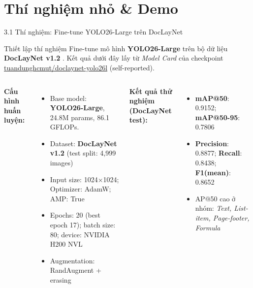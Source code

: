 \documentclass[aspectratio=1610,8pt]{beamer}
\begin{document}
\section{Thí nghiệm nhỏ \& Demo}
\begin{frame}{3.1 \; Thí nghiệm: Fine-tune YOLO26-Large trên DocLayNet}
    \begin{block}{Thiết lập thí nghiệm}
        Fine-tune mô hình \textbf{YOLO26-Large} trên bộ dữ liệu \textbf{DocLayNet v1.2} \cite{dla_benchmark_2022_sigkdd_2022_doclaynet_a_large_human_annotated_dataset_for_documen}.
        Kết quả dưới đây lấy từ \textit{Model Card} của checkpoint \href{https://huggingface.co/tuandunghcmut/doclaynet-yolo26l}{tuandunghcmut/doclaynet-yolo26l} (self-reported).
    \end{block}
    \vspace{0.4em}
    \begin{columns}[T]
        \textbf{Cấu hình huấn luyện:}
        \begin{itemize}
            \item Base model: \textbf{YOLO26-Large}, 24.8M params, 86.1 GFLOPs.
            \item Dataset: \textbf{DocLayNet v1.2} (test split: 4,999 images)
            \item Input size: 1024$\times$1024; Optimizer: AdamW; AMP: True
            \item Epochs: 20 (best epoch 17); batch size: 80; device: NVIDIA H200 NVL
            \item Augmentation: RandAugment + erasing
        \end{itemize}
        \textbf{Kết quả thử nghiệm (DocLayNet test):}
        \begin{itemize}
            \item \textbf{mAP@50}: 0.9152; \textbf{mAP@50-95}: 0.7806
            \item \textbf{Precision}: 0.8877; \textbf{Recall}: 0.8438; \textbf{F1(mean)}: 0.8652
            \item AP@50 cao ở nhóm: \textit{Text, List-item, Page-footer, Formula}
        \end{itemize}
    \end{columns}
\end{frame}
\end{document}
